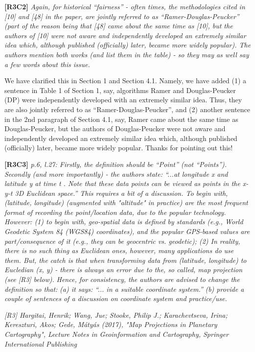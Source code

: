 \documentclass{letter}
\begin{document}
\textbf{[R3C2]} \emph{Again, for historical ``fairness'' - often times, the methodologies cited in [10] and [48] in the paper, are jointly referred to as ``Ramer-Douglas-Peucker'' (part of the reason being that [48] came about the same time as [10], but the authors of [10] were not aware and independently developed an extremely similar idea which, although published (officially) later, became more widely popular). The authors mention both works (and list them in the table) - so they may as well say a few words about this issue.}


We have clarified this in Section 1 and Section 4.1. Namely, we have added
(1) a sentence in Table 1 of Section 1, say, {algorithms Ramer and Douglas-Peucker (DP) were independently developed with an extremely similar idea. Thus, they are also jointly referred to as ``Ramer-Douglas-Peucker''}, and
(2) another sentence in the 2nd paragraph of Section 4.1, say, Ramer came about the same time as Douglas-Peucker, but the authors of Douglas-Peucker were not aware and independently developed an extremely similar idea which, although published (officially) later, became more widely popular.
Thanks for pointing out this!



\textbf{[R3C3]} \emph{p.6, l.27: Firstly, the definition should be ``Point'' (not ``Points''). Secondly (and more importantly) - the authors state: ``...at longitude x and latitude y at time t . Note that these data points can be viewed as points in the x-y-t 3D Euclidean space.'' This requires a bit of a discussion. To begin with, (latitude, longitude) (augmented with "altitude" in practice) are the most frequent format of recording the point/location data, due to the popular technology. However: (1) to begin with, geo-spatial data is defined by standards (e.g., World Geodetic System 84 (WGS84) coordinates), and the popular GPS-based values are part/consequence of it (e.g., they can be geocentric vs. geodetic); (2) In reality, there is no such thing as Euclidean ones, however, many applications do use them. But, the catch is that when transforming data from (latitude, longitude) to Eucledian (x, y) - there is always an error due to the, so called, map projection (see [R3] below).}
\emph{Hence, for consistency, the authors are advised to change the definition so that:}
\emph{(a) it says: ``... in a suitable coordinate system.''}
\emph{(b) provide a couple of sentences of a discussion on coordinate system and practice/use.}

\emph{[R3] Hargitai, Henrik; Wang, Jue; Stooke, Philip J.; Karachevtseva, Irina; Kereszturi, Akos; Gede, Mátyás (2017), "Map Projections in Planetary Cartography", Lecture Notes in Geoinformation and Cartography, Springer International Publishing}
\end{document}
